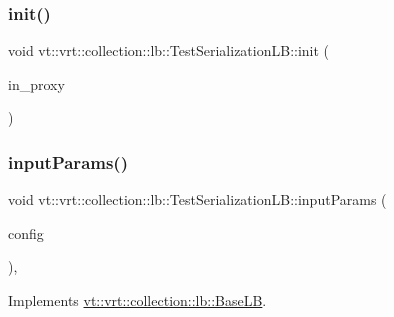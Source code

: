 \subsubsection{\texorpdfstring{init()}{init()}}
{\footnotesize\ttfamily void vt\+::vrt\+::collection\+::lb\+::\+Test\+Serialization\+L\+B\+::init (\begin{DoxyParamCaption}\item[{\hyperlink{structvt_1_1objgroup_1_1proxy_1_1_proxy}{objgroup\+::proxy\+::\+Proxy}$<$ \hyperlink{structvt_1_1vrt_1_1collection_1_1lb_1_1_test_serialization_l_b}{Test\+Serialization\+LB} $>$}]{in\+\_\+proxy }\end{DoxyParamCaption})}

\mbox{\label{structvt_1_1vrt_1_1collection_1_1lb_1_1_test_serialization_l_b_a6d1150f9af14ef8ab51235eaed94c6bf}} 
\subsubsection{\texorpdfstring{input\+Params()}{inputParams()}}
{\footnotesize\ttfamily void vt\+::vrt\+::collection\+::lb\+::\+Test\+Serialization\+L\+B\+::input\+Params (\begin{DoxyParamCaption}\item[{\hyperlink{structvt_1_1vrt_1_1collection_1_1balance_1_1_config_entry}{balance\+::\+Config\+Entry} $\ast$}]{config }\end{DoxyParamCaption})\hspace{0.3cm}{\ttfamily [override]}, {\ttfamily [virtual]}}



Implements \hyperlink{structvt_1_1vrt_1_1collection_1_1lb_1_1_base_l_b_acf56a0cc29f5e00c0dccf2003baa2f43}{vt\+::vrt\+::collection\+::lb\+::\+Base\+LB}.

\mbox{\label{structvt_1_1vrt_1_1collection_1_1lb_1_1_test_serialization_l_b_a47b93135928a6f1635d7c71995d4ed11}} 
